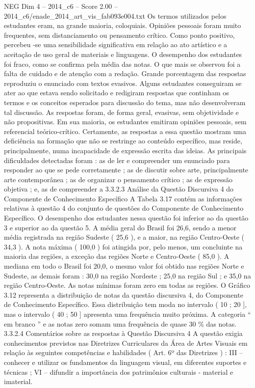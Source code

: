 \begin{textsample}{NEG Dim 4 – 2014\_c6 – Score 2.00 – 2014\_c6/enade\_2014\_art\_vis\_fab093e004.txt}
Os termos utilizados pelos estudantes eram, na grande maioria, coloquiais.
Opiniões pessoais foram muito frequentes, sem distanciamento ou pensamento crítico.
Como ponto positivo, percebeu -se uma sensibilidade significativa em relação ao ato artístico e a aceitação de uso geral de materiais e linguagens.
O desempenho dos estudantes foi fraco, como se confirma pela média das notas.
O que mais se observou foi a falta de cuidado e de atenção com a redação.
Grande porcentagem das respostas reproduziu o enunciado com textos evasivos.
Alguns estudantes conseguiram se ater ao que estava sendo solicitado e redigiram respostas que continham os termos e os conceitos esperados para discussão do tema, mas não desenvolveram tal discussão.
As respostas foram, de forma geral, evasivas, sem objetividade e não propositivas.
Em sua maioria, os estudantes emitiram opiniões pessoais, sem referencial teórico-crítico.
Certamente, as respostas a essa questão mostram uma deficiência na formação que não se restringe ao conteúdo específico, mas reside, principalmente, numa incapacidade de expressão escrita das ideias.
As principais dificuldades detectadas foram : as de ler e compreender um enunciado para responder ao que se pede corretamente ; as de discutir sobre arte, principalmente arte contemporânea ; as de organizar o pensamento crítico ; as de expressão objetiva ; e, as de compreender a 3.3.2.3 Análise da Questão Discursiva 4 do Componente de Conhecimento Específico A Tabela 3.17 contém as informações relativas à questão 4 do conjunto de questões do Componente de Conhecimento Específico.
O desempenho dos estudantes nessa questão foi inferior ao da questão 3 e superior ao da questão 5.
A média geral do Brasil foi 26,6, sendo a menor média registrada na região Sudeste ( 25,6 ), e a maior, na região Centro-Oeste ( 34,3 ).
A nota máxima ( 100,0 ) foi atingida por, pelo menos, um concluinte na maioria das regiões, a exceção das regiões Norte e Centro-Oeste ( 85,0 ).
A mediana em todo o Brasil foi 20,0, o mesmo valor foi obtido nas regiões Norte e Sudeste, as demais foram : 30,0 na região Nordeste ; 25,0 na região Sul ; e 35,0 na região Centro-Oeste.
As notas mínimas foram zero em todas as regiões.
O Gráfico 3.12 representa a distribuição de notas da questão discursiva 4, do Componente de Conhecimento Específico.
Essa distribuição tem moda no intervalo ( 10 ; 20 ], mas o intervalo ( 40 ; 50 ] apresenta uma frequência muito próxima.
A categoria “ em branco ” e as notas zero somam uma frequência de quase 30 \% das notas. 3.3.2.4 Comentários sobre as respostas à Questão Discursiva 4 A questão exigia conhecimentos previstos nas Diretrizes Curriculares da Área de Artes Visuais em relação às seguintes competências e habilidades ( Art. 6º das Diretrizes ) : III – conhecer e utilizar os fundamentos da linguagem visual, em diferentes suportes e técnicas ; VI – difundir a importância dos patrimônios culturais - material e imaterial.

\end{textsample}
